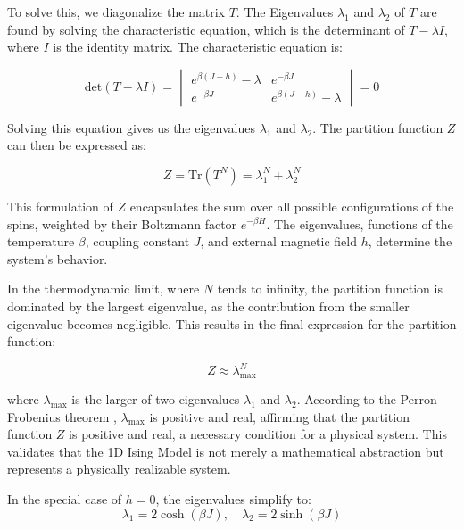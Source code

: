 To solve this, we diagonalize the matrix \( T \). The Eigenvalues \( \lambda_1
\) and \( \lambda_2 \) of \( T \) are found by solving the characteristic
equation, which is the determinant of \( T - \lambda I \), where \( I \) is the
identity matrix. The characteristic equation is:

\begin{equation}
\text{det}(T - \lambda I) = \begin{vmatrix}
    e^{\beta(J+h)} - \lambda & e^{-\beta J} \\
    e^{-\beta J} & e^{\beta(J-h)} - \lambda
\end{vmatrix} = 0
\end{equation}

Solving this equation gives us the eigenvalues \( \lambda_1 \) and \( \lambda_2
\). The partition function \( Z \) can then be expressed as:

\begin{equation}
Z = \text{Tr}(T^N) = \lambda_1^N + \lambda_2^N
\end{equation}

This formulation of \( Z \) encapsulates the sum over all possible
configurations of the spins, weighted by their Boltzmann factor \( e^{-\beta H}
\). The eigenvalues, functions of the temperature \( \beta \), coupling constant
\( J \), and external magnetic field \( h \), determine the system's behavior.

In the thermodynamic limit, where \( N \) tends to infinity, the partition
function is dominated by the largest eigenvalue, as the contribution from the
smaller eigenvalue becomes negligible. This results in the final expression for
the partition function:

\begin{equation}
Z \approx \lambda_{\text{max}}^N
\label{eq:partitionmax}
\end{equation}

where \( \lambda_{\text{max}} \) is the larger of two eigenvalues \( \lambda_1
\) and \( \lambda_2 \). According to the Perron-Frobenius theorem
\cite{Pillai2005}, \( \lambda_{\text{max}} \) is positive and real, affirming
that the partition function \( Z \) is positive and real, a necessary condition
for a physical system. This validates that the 1D Ising Model is not merely a
mathematical abstraction but represents a physically realizable system.

In the special case of \( h = 0 \), the eigenvalues simplify to:
\begin{equation}
 \lambda_1 = 2 \cosh(\beta J), \quad \lambda_2 = 2 \sinh(\beta J)
\end{equation}

